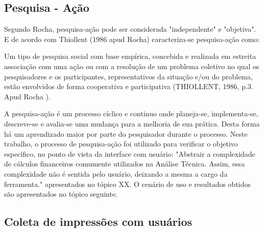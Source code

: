 \subsection{Pesquisa - Ação}
Segundo Rocha, pesquisa-ação pode ser considerada "independente" e "objetiva". E de acordo com Thiollent (1986 apud Rocha) caracteriza-se pesquisa-ação como:
\begin{citacao}
Um tipo de pesquisa social com base empírica, concebida e realizada em estreita associação com uma ação ou com a resolução de um problema coletivo no qual os pesquisadores e os participantes, representativos da situação e/ou do problema, estão envolvidos de forma cooperativa e participativa (THIOLLENT, 1986, p.3. Apud Rocha ).
\end{citacao}

A pesquisa-ação é um processo cíclico e continuo onde planeja-se, implementa-se, descreve-se e avalia-se uma mudança para a melhoria de sua prática. Desta forma há um aprendizado maior por parte do pesquisador durante o processo. Neste trabalho, o processo de pesquisa-ação foi utilizado para verificar o objetivo específico, no ponto de vista da interface com usuário: "Abstrair a complexidade de cálculos financeiros comumente utilizados na Análise Técnica. Assim, essa complexidade não é sentida pelo usuário, deixando a mesma a cargo da ferramenta." apresentados no tópico XX. O cenário de uso e resultados obtidos são apresentados no tópico seguinte.


\subsection{Coleta de impressões com usuários}

